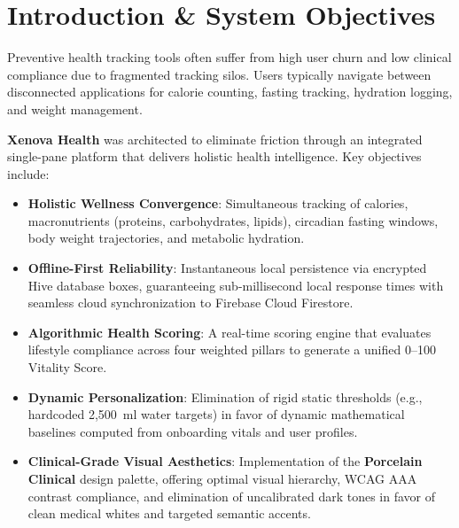 \documentclass[12pt,a4paper]{article}
\makeatletter
\renewcommand\tableofcontents{%
    \begin{center}%
        \normalfont\fontsize{16}{20}\bfseries\contentsname\par
    \end{center}%
    \vspace{0.6cm}%
    \@starttoc{toc}%
}
\renewcommand\listoffigures{%
    \begin{center}%
        \normalfont\fontsize{16}{20}\bfseries\listfigurename\par
    \end{center}%
    \vspace{0.6cm}%
    \@starttoc{lof}%
}
\renewcommand\listoftables{%
    \begin{center}%
        \normalfont\fontsize{16}{20}\bfseries\listtablename\par
    \end{center}%
    \vspace{0.6cm}%
    \@starttoc{lot}%
}
\makeatother
\begin{document}
\begingroup
\pagestyle{empty}
\tableofcontents
\clearpage
\endgroup

\pagestyle{fancy}
\listoffigures
\clearpage
{}
\listoftables
\clearpage

\clearpage
{}
\pagestyle{fancy}

\section{Introduction \& System Objectives}
Preventive health tracking tools often suffer from high user churn and low clinical compliance due to fragmented tracking silos. Users typically navigate between disconnected applications for calorie counting, fasting tracking, hydration logging, and weight management. 

\textbf{Xenova Health} was architected to eliminate friction through an integrated single-pane platform that delivers holistic health intelligence. Key objectives include:
\begin{itemize}[leftmargin=1.5em]
    \item \textbf{Holistic Wellness Convergence}: Simultaneous tracking of calories, macronutrients (proteins, carbohydrates, lipids), circadian fasting windows, body weight trajectories, and metabolic hydration.
    \item \textbf{Offline-First Reliability}: Instantaneous local persistence via encrypted Hive database boxes, guaranteeing sub-millisecond local response times with seamless cloud synchronization to Firebase Cloud Firestore.
    \item \textbf{Algorithmic Health Scoring}: A real-time scoring engine that evaluates lifestyle compliance across four weighted pillars to generate a unified 0--100 Vitality Score.
    \item \textbf{Dynamic Personalization}: Elimination of rigid static thresholds (e.g., hardcoded 2,500~ml water targets) in favor of dynamic mathematical baselines computed from onboarding vitals and user profiles.
    \item \textbf{Clinical-Grade Visual Aesthetics}: Implementation of the \textbf{Porcelain Clinical} design palette, offering optimal visual hierarchy, WCAG AAA contrast compliance, and elimination of uncalibrated dark tones in favor of clean medical whites and targeted semantic accents.
\end{itemize}
\end{document}
